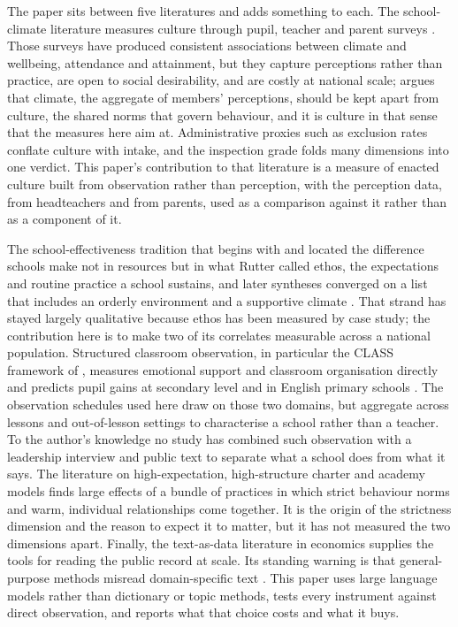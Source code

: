 The paper sits between five literatures and adds something to each. The
school-climate literature measures culture through pupil, teacher and parent
surveys \citep{hoy2001,cohen2009,thapa2013}. Those surveys have produced
consistent associations between climate and wellbeing, attendance and
attainment, but they capture perceptions rather than practice, are open to
social desirability, and are costly at national scale; \citet{vanhoutte2005}
argues that climate, the aggregate of members' perceptions, should be kept
apart from culture, the shared norms that govern behaviour, and it is culture
in that sense that the measures here aim at. Administrative proxies such as
exclusion rates \citep{machin2020} conflate culture with intake, and the
inspection grade folds many dimensions into one verdict. This paper's
contribution to that literature is a measure of enacted culture built from
observation rather than perception, with the perception data, from
headteachers and from parents, used as a comparison against it rather than as
a component of it.

The school-effectiveness tradition that begins with \citet{coleman1966} and
\citet{rutter1979} located the difference schools make not in resources but
in what Rutter called ethos, the expectations and routine practice a school
sustains, and later syntheses converged on a list that includes an orderly
environment and a supportive climate \citep{edmonds1979,sammons1995,teddlie2000}.
That strand has stayed largely qualitative because ethos has been measured
by case study; the contribution here is to make two of its correlates
measurable across a national population. Structured classroom observation,
in particular the CLASS framework of \citet{hamre2007}, measures emotional
support and classroom organisation directly and predicts pupil gains at
secondary level \citep{allen2013} and in English primary schools
\citep{sammons2008}. The observation schedules used here draw on those two
domains, but aggregate across lessons and out-of-lesson settings to
characterise a school rather than a teacher. To the author's knowledge no
study has combined such observation with a leadership interview and public
text to separate what a school does from what it says. The literature on
high-expectation, high-structure charter and academy models
\citep{abdulkadiroglu2011,angrist2010,dobbie2013,fryer2014} finds large
effects of a bundle of practices in which strict behaviour norms and warm,
individual relationships come together. It is the origin of the strictness
dimension and the reason to expect it to matter, but it has not measured the
two dimensions apart. Finally, the text-as-data literature in economics
\citep{gentzkow2019} supplies the tools for reading the public record at
scale. Its standing warning is that general-purpose methods misread
domain-specific text \citep{loughran2011,muddiman2019}. This paper uses large
language models rather than dictionary or topic methods, tests every
instrument against direct observation, and reports what that choice costs and
what it buys.

